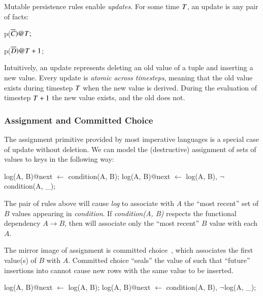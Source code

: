 Mutable persistence rules enable {\em updates}.  For some time $\DT$, an update
is any pair of facts:

\begin{dedalus}
p\nega($\overline{C})@\DT;$
\end{dedalus}

\begin{dedalus}
p\pos($\overline{D})@\DT+1$;
\end{dedalus}


\noindent Intuitively, an update represents deleting an old value of a
tuple and inserting a new value.  Every update is {\em atomic across
  timesteps}, meaning that the old value exists during timestep $\DT$
when the new value is derived.  During the evaluation of timestep
$\DT+1$ the new value exists, and the old does not.

\subsubsection{Assignment and Committed Choice}

The assignment primitive provided by most imperative languages is a special case
of update without deletion.  We can model the (destructive) assignment of sets
of values to keys in the following way:

\begin{Dedalus}
log(A, B)@next \(\leftarrow\) condition(A, B);
log(A, B)@next \(\leftarrow\) log(A, B), \(\lnot\)condition(A, _);
\end{Dedalus}

The pair of rules above will cause {\em log} to associate with $A$ the ``most
recent'' set of $B$ values appearing in {\em condition}.  If {\em condition(A,
B)} respects the functional dependency $A \to B$, then  will
associate only the ``most recent'' $B$ value with each $A$.

The mirror image of assignment is committed choice~\cite{committedchoice},
which associates the first
value(s) of $B$ with $A$.  Committed choice ``seals'' the value of  such that ``future''
insertions into  cannot cause new rows with the same
 value to be inserted.

\begin{Dedalus}
log(A, B)@next \(\leftarrow\) log(A, B);
log(A, B)@next \(\leftarrow\) condition(A, B), \(\lnot\)log(A, _);
\end{Dedalus}

